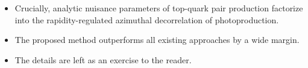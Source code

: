 \begin{itemize}
  \item Crucially, analytic nuisance parameters of top-quark pair production factorize into the rapidity-regulated azimuthal decorrelation of photoproduction.
  \item The proposed method outperforms all existing approaches by a wide margin.
  \item The details are left as an exercise to the reader.
\end{itemize}

